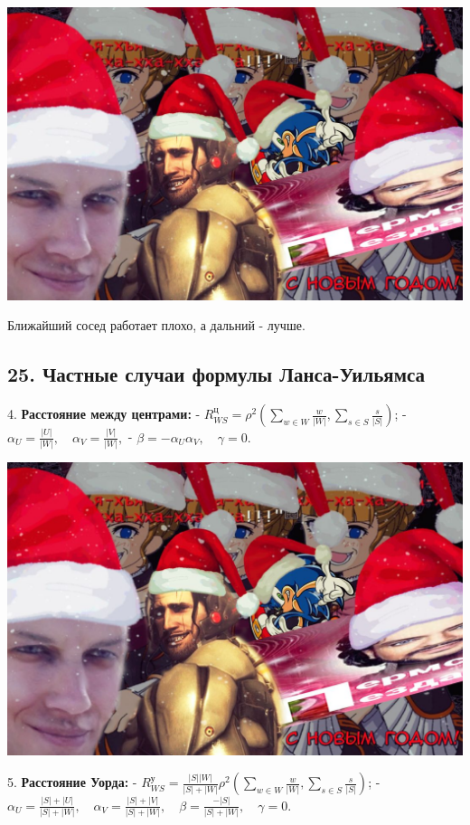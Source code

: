 \includegraphics[scale=0.3]{figures/samplefigure.jpg}

Ближайший сосед работает плохо, а дальний - лучше.

\subsection{25. Частные случаи формулы Ланса-Уильямса}

4. \textbf{Расстояние между центрами:}
    - $\displaystyle R_{WS}^{ц} = \rho^2 {\left( \sum_{w \in W}{\frac{w}{\vert W \vert}}, \sum_{s \in S}{\frac{s}{\vert S \vert}} \right)}$;
    - $\alpha_U = \frac{\vert U \vert}{\vert W \vert}, \quad \alpha_V = \frac{\vert V \vert}{\vert W \vert},$
    - $\beta = - \alpha_U \alpha_V, \quad \gamma = 0.$

\includegraphics[scale=0.3]{figures/samplefigure.jpg}

5. \textbf{Расстояние Уорда:}
    - $\displaystyle R_{WS}^{у} = \frac{{\vert S \vert}{\vert W \vert}}{{\vert S \vert} + {\vert W \vert}} \rho^2 {\left( \sum_{w \in W}{\frac{w}{\vert W \vert}}, \sum_{s \in S}{\frac{s}{\vert S \vert}} \right)}$;
    - $\alpha_U = \frac{{\vert S \vert} + {\vert U \vert}}{{\vert S \vert} + {\vert W \vert}}, \quad \alpha_V = \frac{{\vert S \vert} + {\vert V \vert}}{{\vert S \vert} + {\vert W \vert}}, \quad \beta = \frac{-{\vert S \vert}}{{\vert S \vert} + {\vert W \vert}}, \quad \gamma = 0.$

